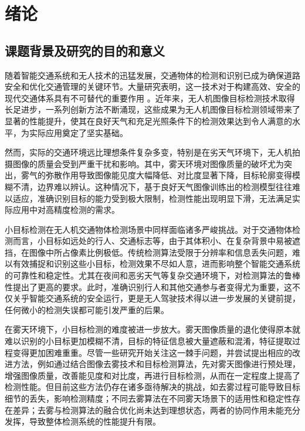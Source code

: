 \section{绪论\label{绪论}}

\subsection{课题背景及研究的目的和意义}

随着智能交通系统和无人技术的迅猛发展，交通物体的检测和识别已成为确保道路安全和优化交通管理的关键环节。大量研究表明，这一技术对于构建高效、安全的现代交通体系具有不可替代的重要作用 \cite{review1, review2, review3}。近年来，无人机图像目标检测技术取得长足进步，一系列创新方法不断涌现\cite{ye2022dense, Mffsodnet, sun2022rsod}，这些成果为无人机图像目标检测领域带来了显著的性能提升，使其在良好天气和充足光照条件下的检测效果达到令人满意的水平，为实际应用奠定了坚实基础。

然而，实际的交通环境远比理想条件复杂多变，特别是在劣天气环境下，无人机拍摄图像的质量会受到严重干扰和影响。其中，雾天环境对图像质量的破坏尤为突出，雾气的弥散作用导致图像能见度大幅降低、对比度显著下降，目标轮廓变得模糊不清，边界难以辨认。这种情况下，基于良好天气图像训练出的检测模型往往难以适应，准确识别目标的能力受到极大限制，检测性能出现明显下滑，无法满足实际应用中对高精度检测的需求。

小目标检测在无人机交通物体检测场景中同样面临诸多严峻挑战。对于交通物体检测而言，小目标如远处的行人、交通标志等，由于其体积小、在复杂背景中易被遮挡，在图像中所占像素比例极低。传统检测算法受限于分辨率和信息丢失问题，难以有效捕捉和识别这些小目标，检测效果不尽如人意，进而影响整个智能交通系统的可靠性和稳定性。尤其在夜间和恶劣天气等复杂交通环境下，对检测算法的鲁棒性提出了更高的要求。此时，准确识别行人和其他交通参与者变得尤为重要，这不仅关乎智能交通系统的安全运行，更是无人驾驶技术得以进一步发展的关键前提，任何微小的检测失误都可能引发严重的后果。

在雾天环境下，小目标检测的难度被进一步放大。雾天图像质量的退化使得原本就难以识别的小目标更加模糊不清，目标的特征信息被大量遮蔽和混淆，特征提取过程变得更加困难重重。尽管一些研究开始关注这一棘手问题，并尝试提出相应的改进方法，例如通过结合图像去雾技术和目标检测算法，先对雾天图像进行预处理，增强图像质量，改善能见度和对比度，再进行目标检测，从而在一定程度上提高了检测性能。但目前这些方法仍存在诸多亟待解决的挑战，如去雾过程可能导致目标细节的丢失，影响检测精度；不同去雾算法在不同雾天场景下的适用性和稳定性存在差异；去雾与检测算法的融合优化尚未达到理想状态，两者的协同作用未能充分发挥，导致整体检测系统的性能提升有限。

